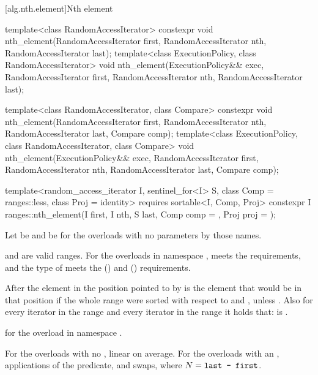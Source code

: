[alg.nth.element]{Nth element}

%
\begin{itemdecl}
template<class RandomAccessIterator>
  constexpr void nth_element(RandomAccessIterator first, RandomAccessIterator nth,
                             RandomAccessIterator last);
template<class ExecutionPolicy, class RandomAccessIterator>
  void nth_element(ExecutionPolicy&& exec,
                   RandomAccessIterator first, RandomAccessIterator nth,
                   RandomAccessIterator last);

template<class RandomAccessIterator, class Compare>
  constexpr void nth_element(RandomAccessIterator first, RandomAccessIterator nth,
                             RandomAccessIterator last,  Compare comp);
template<class ExecutionPolicy, class RandomAccessIterator, class Compare>
  void nth_element(ExecutionPolicy&& exec,
                   RandomAccessIterator first, RandomAccessIterator nth,
                   RandomAccessIterator last, Compare comp);

template<random_access_iterator I, sentinel_for<I> S, class Comp = ranges::less,
         class Proj = identity>
  requires sortable<I, Comp, Proj>
  constexpr I
    ranges::nth_element(I first, I nth, S last, Comp comp = {}, Proj proj = {});
\end{itemdecl}

\begin{itemdescr}
\pnum
Let  be 
and  be 
for the overloads with no parameters by those names.

\pnum
\expects
{} and  are valid ranges.
For the overloads in namespace ,
 meets
the  requirements, and
the type of  meets
the  () and
 () requirements.

\pnum
\effects
After  the element in the position pointed to by 
is the element that would be in that position
if the whole range were sorted with respect to  and ,
unless .
Also for every iterator  in the range 
and every iterator  in the range 
it holds that:
 is .

\pnum
\returns
{} for the overload in namespace .

\pnum
\complexity
For the overloads with no , linear on average.
For the overloads with an ,  applications of
the predicate, and  swaps, where $N = \texttt{last - first}$.
\end{itemdescr}

